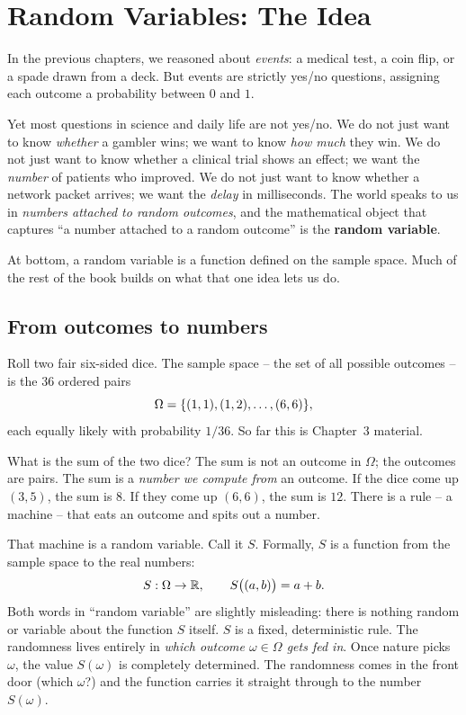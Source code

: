 \chapter{Random Variables: The Idea}

In the previous chapters, we reasoned about \emph{events}: a medical test, a coin
flip, or a spade drawn from a deck. But events are strictly yes/no questions,
assigning each outcome a probability between $0$ and $1$.

Yet most questions in science and daily life are not yes/no. We do not just want
to know \emph{whether} a gambler wins; we want to know \emph{how much} they win. We
do not just want to know whether a clinical trial shows an effect; we want the
\emph{number} of patients who improved. We do not just want to know whether a network packet
arrives; we want the \emph{delay} in milliseconds. The world speaks to us in
\emph{numbers attached to random outcomes}, and the mathematical object that captures
``a number attached to a random outcome'' is the \textbf{random variable}.

At bottom, a random variable is a function defined on the sample space.
Much of the rest of the book builds on what that one idea lets us do.

\section{From outcomes to numbers}
\label{ch06:outcomes-to-numbers}

Roll two fair six-sided dice. The sample space -- the set of all possible
outcomes -- is the $36$ ordered pairs
\[
  \Omega = \{(1,1),(1,2),\dots,(6,6)\},
\]
each equally likely with probability $1/36$. So far this is Chapter~3 material.

What is the sum of the two dice? The sum is not an
outcome in $\Omega$; the outcomes are pairs. The sum is a \emph{number we compute from}
an outcome. If the dice come up $(3,5)$, the sum is $8$. If they come up $(6,6)$, the
sum is $12$. There is a rule -- a machine -- that eats an outcome and spits out a
number.

That machine is a random variable. Call it $S$. Formally, $S$ is a function from the
sample space to the real numbers:
\[
  S : \Omega \to \mathbb{R}, \qquad S\big((a,b)\big) = a + b.
\]
Both words in ``random variable'' are slightly misleading: there is nothing
random or variable about the function $S$ itself. $S$ is a fixed,
deterministic rule. The randomness lives entirely in \emph{which outcome
$\omega \in \Omega$ gets fed in}. Once nature picks $\omega$, the value $S(\omega)$ is
completely determined. The randomness comes in the front door (which $\omega$?) and
the function carries it straight through to the number $S(\omega)$.

